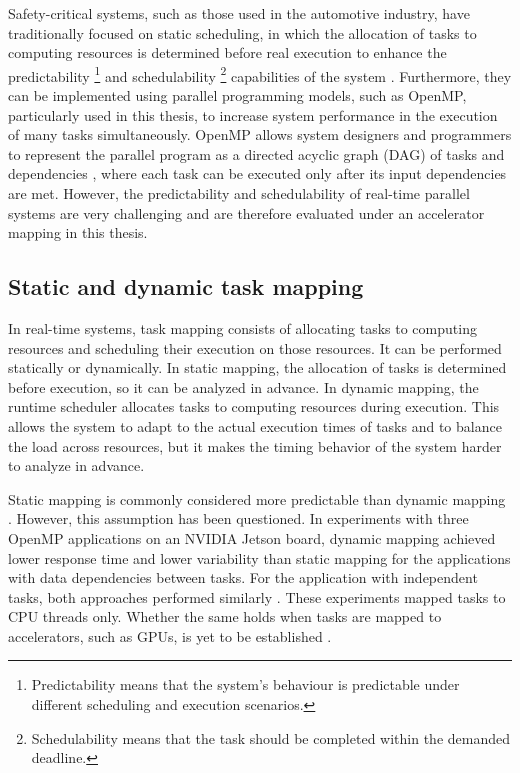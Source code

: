 Safety-critical systems, such as those used in the automotive industry, have traditionally focused on static scheduling, in which the allocation of tasks to computing resources is determined before real execution to enhance the predictability \footnote{Predictability means that the system's behaviour is predictable under different scheduling and execution scenarios.} and schedulability \footnote{Schedulability means that the task should be completed within the demanded deadline.} capabilities of the system \parencite{Melani2017StaticOpenMP}. Furthermore, they can be implemented using parallel programming models, such as OpenMP, particularly used in this thesis, to increase system performance in the execution of many tasks simultaneously. OpenMP allows system designers and programmers to represent the parallel program as a directed acyclic graph (DAG) of tasks and dependencies \parencite{Samadi2026Accelerator,Melani2017StaticOpenMP}, where each task can be executed only after its input dependencies are met. However, the predictability and schedulability of real-time parallel systems are very challenging and are therefore evaluated under an accelerator mapping in this thesis.

\subsection{Static and dynamic task mapping}
\label{sec:chap1_static_dynamic}

In real-time systems, task mapping consists of allocating tasks to computing resources and scheduling their execution on those resources. It can be performed statically or dynamically. In static mapping, the allocation of tasks is determined before execution, so it can be analyzed in advance. In dynamic mapping, the runtime scheduler allocates tasks to computing resources during execution. This allows the system to adapt to the actual execution times of tasks and to balance the load across resources, but it makes the timing behavior of the system harder to analyze in advance.

Static mapping is commonly considered more predictable than dynamic mapping \parencite{Melani2017StaticOpenMP}. However, this assumption has been questioned. In experiments with three OpenMP applications on an NVIDIA Jetson board, dynamic mapping achieved lower response time and lower variability than static mapping for the applications with data dependencies between tasks. For the application with independent tasks, both approaches performed similarly \parencite{Samadi2024StaticDynamic}. These experiments mapped tasks to CPU threads only. Whether the same holds when tasks are mapped to accelerators, such as GPUs, is yet to be established \parencite{Samadi2026Accelerator}.

